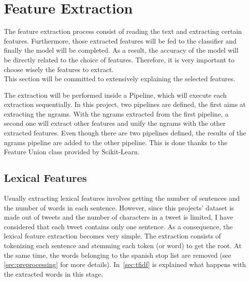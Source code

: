 \section{Feature Extraction}
\label{sec:feature}
 The feature extraction process consist of reading the text and extracting certain features. Furthermore, those extracted features will be fed to the classifier and finally the model will be completed. As a result, the accuracy of the model will be directly related to the choice of features. Therefore, it is very important to choose wisely the features to extract.\\
This section will be committed to extensively explaining the selected features.
\par
The extraction will be performed inside a Pipeline, which will execute each extraction sequentially. In this project, two pipelines are defined, the first aims at extracting the ngrams. With the ngrams extracted from the first pipeline, a second one will extract other features and unify the ngrams with the other extracted features. Even though there are two pipelines defined, the results of the ngrams pipeline are added to the other pipeline. This is done thanks to the Feature Union class provided by Scikit-Learn.
\subsection{Lexical Features}
Usually extracting lexical features involves getting the number of sentences and the number of words in each sentence. However, since this projects' dataset is made out of tweets and the number of characters in a tweet is limited, I have considered that each tweet contains only one sentence. As a consequence, the lexical feature extraction becomes very simple. The extraction consists of tokenizing each sentence and stemming each token (or word) to get the root. At the same time, the words belonging to the spanish stop list are removed (see \cref{sec:preprocessing} for more details). In~\cref{sec:tfidf} is explained what happens with the extracted words in this stage.
